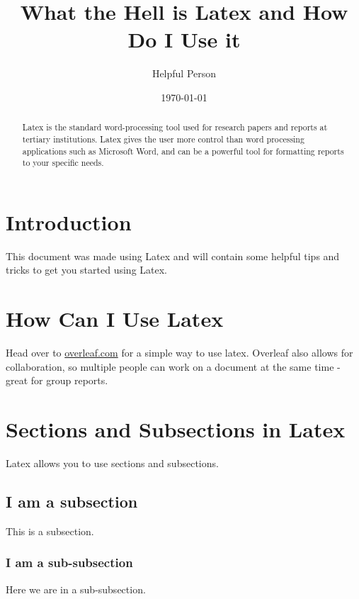 \documentclass[11pt]{article}
\title{What the Hell is Latex and How Do I Use it}
\author{Helpful Person}
\date{\today}
\begin{document}
\maketitle

\begin{abstract}
   Latex is the standard word-processing tool used for research papers and reports at tertiary institutions. Latex gives the user more control than word processing applications such as Microsoft Word, and can be a powerful tool for formatting reports to your specific needs. 
\end{abstract}

\section{Introduction}
This document was made using Latex and will contain some helpful tips and tricks to get you started using Latex.

\section{How Can I Use Latex}
Head over to \href{https://www.overleaf.com/}{overleaf.com} for a simple way to use latex. Overleaf also allows for collaboration, so multiple people can work on a document at the same time - great for group reports.

\section{Sections and Subsections in Latex}
Latex allows you to use sections and subsections.
\subsection{I am a subsection}
This is a subsection.
\subsubsection{I am a sub-subsection}
Here we are in a sub-subsection.
\end{document}
